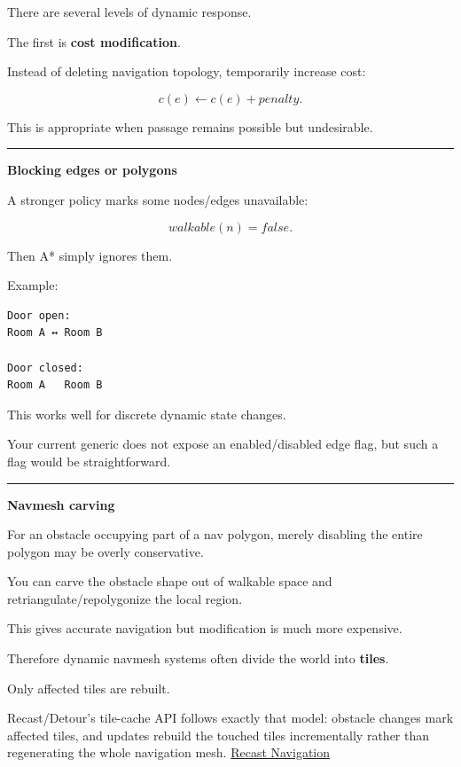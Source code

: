 There are several levels of dynamic response.

The first is \textbf{cost modification}.

Instead of deleting navigation topology, temporarily increase cost:

\[
c(e)\leftarrow c(e)+penalty.
\]

This is appropriate when passage remains possible but undesirable.

\begin{center}\rule{0.5\linewidth}{0.5pt}\end{center}

\textbf{Blocking edges or polygons}

A stronger policy marks some nodes/edges unavailable:

\[
walkable(n)=false.
\]

Then A* simply ignores them.

Example:

\begin{verbatim}
Door open:
Room A ↔ Room B

Door closed:
Room A   Room B
\end{verbatim}

This works well for discrete dynamic state changes.

Your current generic  does not expose an enabled/disabled edge flag, but such a flag would be straightforward.

\begin{center}\rule{0.5\linewidth}{0.5pt}\end{center}

\textbf{Navmesh carving}

For an obstacle occupying part of a nav polygon, merely disabling the entire polygon may be overly conservative.

You can carve the obstacle shape out of walkable space and retriangulate/repolygonize the local region.

This gives accurate navigation but modification is much more expensive.

Therefore dynamic navmesh systems often divide the world into \textbf{tiles}.

Only affected tiles are rebuilt.

Recast/Detour's tile-cache API follows exactly that model: obstacle changes mark affected tiles, and updates rebuild the touched tiles incrementally rather than regenerating the whole navigation mesh. \href{https://recastnav.com/classdtTileCache.html?utm_source=chatgpt.com}{Recast Navigation}

